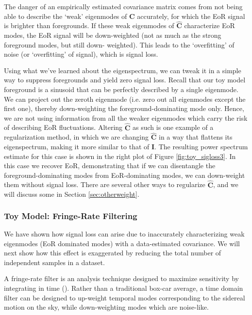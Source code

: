 \documentclass[preprint2,numberedappendix,tighten]{aastex6}  %
\begin{document}
The danger of an empirically estimated covariance matrix comes from not being able to describe the `weak' eigenmodes of $
\textbf{C}$ accurately, for which the EoR signal is brighter than foregrounds. If these weak eigenmodes of $\hat{\textbf{C}}$ 
characterize EoR modes, the EoR signal will be down-weighted (not as much as the strong foreground modes, but still down-
weighted). This leads to the `overfitting' of noise (or `overfitting' of signal), which is signal loss. 

Using what we've learned about the eigenspectrum, we can tweak it in a simple way to suppress foregrounds and yield zero 
signal loss. Recall that our toy model foreground is a sinusoid that can be perfectly described by a single eigenmode. We can 
project out the zeroth eigenmode (i.e. zero out all eigenmodes except the first one), thereby down-weighting the foreground-dominating mode only. Hence, we are not using information from all the weaker eigenmodes which carry the risk of 
describing EoR fluctuations. Altering $\hat{\textbf{C}}$ as such is one example of a regularization method, in which we are 
changing $\hat{\textbf{C}}$ in a way that flattens its eigenspectrum, making it more similar to that of $\textbf{I}$. The resulting 
power spectrum estimate for this case is shown in the right plot of Figure \ref{fig:toy_sigloss3}. In this case we recover EoR, 
demonstrating that if we can disentangle the foreground-dominating modes from EoR-dominating modes, we can down-weight 
them without signal loss. There are several other ways to regularize $\hat{\textbf{C}}$, and we will discuss some in Section 
\ref{sec:otherweight}.

\subsubsection{Toy Model: Fringe-Rate Filtering}

We have shown how signal loss can arise due to inaccurately characterizing weak eigenmodes (EoR dominated modes) with a 
data-estimated covariance. We will next show how this effect is exaggerated by reducing the total number of independent 
samples in a dataset. 

A fringe-rate filter is an analysis technique designed to maximize sensitivity by integrating in time (\citealt{parsons_et_al2016}). 
Rather than a traditional box-car average, a time domain filter can be designed to up-weight temporal modes corresponding to 
the sidereal motion on the sky, while down-weighting modes which are noise-like. 
\end{document}
